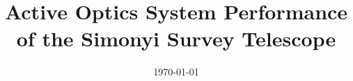 \documentclass[modern]{aastex62}
\begin{document}

\date{\today}
\title{Active Optics System Performance of the Simonyi Survey Telescope}





%



%
\end{document}
